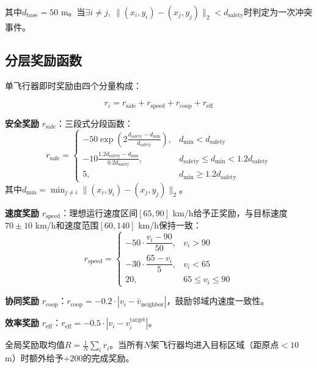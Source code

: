 \documentclass[12pt,a4paper,UTF8]{ctexart}
\begin{document}
其中$d_{\text{base}} = 50$ m。当$\exists i \neq j,\ \|(x_i, y_i) - (x_j, y_j)\|_2 < d_{\text{safety}}$时判定为一次冲突事件。

\subsection{分层奖励函数}

单飞行器即时奖励由四个分量构成：

\begin{equation}
    r_i = r_{\text{safe}} + r_{\text{speed}} + r_{\text{coop}} + r_{\text{eff}}
\end{equation}

\textbf{安全奖励} $r_{\text{safe}}$：三段式分段函数：
\begin{equation}
    r_{\text{safe}} =
    \begin{cases}
        -50 \exp\!\left(2\frac{d_{\text{safety}} - d_{\min}}{d_{\text{safety}}}\right), & d_{\min} < d_{\text{safety}} \\[8pt]
        -10\frac{1.2d_{\text{safety}} - d_{\min}}{0.2d_{\text{safety}}}, & d_{\text{safety}} \leq d_{\min} < 1.2d_{\text{safety}} \\[8pt]
        5, & d_{\min} \geq 1.2d_{\text{safety}}
    \end{cases}
\end{equation}
其中$d_{\min} = \min_{j \neq i} \|(x_i, y_i) - (x_j, y_j)\|_2$。

\textbf{速度奖励} $r_{\text{speed}}$：理想运行速度区间$[65, 90]$ km/h给予正奖励，与目标速度$70\pm10$ km/h和速度范围$[60, 140]$ km/h保持一致：
\begin{equation}
    r_{\text{speed}} =
    \begin{cases}
        -50 \cdot \dfrac{v_i - 90}{50}, & v_i > 90 \\[10pt]
        -30 \cdot \dfrac{65 - v_i}{5}, & v_i < 65 \\[10pt]
        20, & 65 \leq v_i \leq 90
    \end{cases}
\end{equation}

\textbf{协同奖励} $r_{\text{coop}}$：$r_{\text{coop}} = -0.2 \cdot |v_i - \bar{v}_{\text{neighbor}}|$，鼓励邻域内速度一致性。

\textbf{效率奖励} $r_{\text{eff}}$：$r_{\text{eff}} = -0.5 \cdot |v_i - v_i^{\text{target}}|$。

全局奖励取均值$R = \frac{1}{N}\sum_i r_i$。当所有$N$架飞行器均进入目标区域（距原点$<10$ m）时额外给予$+200$的完成奖励。
\end{document}
